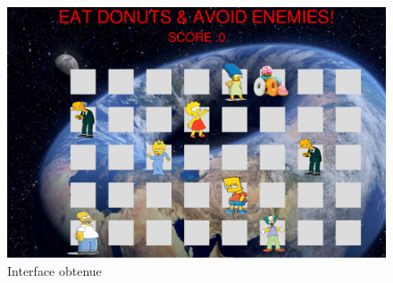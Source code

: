 \vspace{0.7cm}

\FloatBarrier %
\begin{figure}[!h]
\centering
\includegraphics[width=14cm,scale=1]{Capture.PNG}
\caption{Interface obtenue}
\end{figure}
\FloatBarrier
